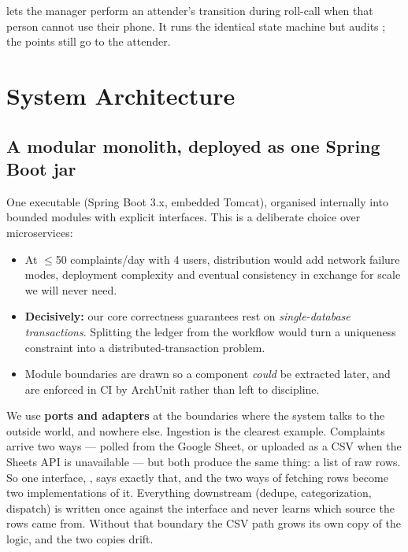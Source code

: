 \documentclass[10pt,a4paper]{article}
\begin{document}
 lets the manager perform an attender's transition during roll-call when that person
cannot use their phone. It runs the identical state machine but audits
; the points still go to the attender.

\section{System Architecture}

\subsection{A modular monolith, deployed as one Spring Boot jar}

One executable  (Spring Boot 3.x, embedded Tomcat), organised internally into bounded
modules with explicit interfaces. This is a deliberate choice over microservices:

\begin{itemize}
  \item At $\le$50 complaints/day with 4 users, distribution would add network failure modes,
        deployment complexity and eventual consistency in exchange for scale we will never need.
  \item \textbf{Decisively:} our core correctness guarantees rest on \emph{single-database
        transactions}. Splitting the ledger from the workflow would turn a uniqueness constraint
        into a distributed-transaction problem.
  \item Module boundaries are drawn so a component \emph{could} be extracted later, and are
        enforced in CI by ArchUnit rather than left to discipline.
\end{itemize}

We use \textbf{ports and adapters} at the boundaries where the system talks to the outside world,
and nowhere else. Ingestion is the clearest example. Complaints arrive two ways --- polled from the
Google Sheet, or uploaded as a CSV when the Sheets API is unavailable --- but both produce the same
thing: a list of raw rows. So one interface, , says exactly that, and the two
ways of fetching rows become two implementations of it. Everything downstream (dedupe,
categorization, dispatch) is written once against the interface and never learns which source the
rows came from. Without that boundary the CSV path grows its own copy of the logic, and the two
copies drift.
\end{document}
